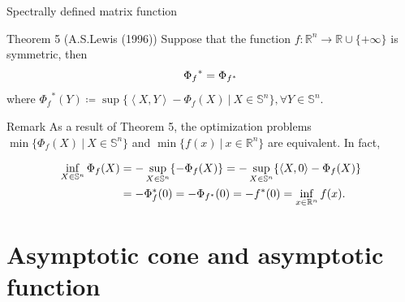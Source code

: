 \documentclass[aspectratio=169, dvipdfmx, 11pt]{beamer}
\newcommand{\RealNumberSet}{\mathbb{R}}
\newcommand{\NDemenstionalRealEuclideanSpace}{\mathbb{R}^n}
\newcommand{\NDemenstionalRealSymmetricMatrixSpace}{\mathbb{S}^n}
\newcommand{\InnerProduct}[2]{\left\langle {#1},{#2}\right\rangle} %
\newcommand{\ExtendedRealValuedFunction}[2]{{#1}: {#2} \to \RealNumberSet \cup \{+\infty\}}
\newcommand{\ConjugateFunction}[1]{{#1}^*}
\begin{document}
\begin{frame}{Spectrally defined matrix function}
  \begin{block}{Theorem 5 (A.S.Lewis (1996))}
    Suppose that the function $\ExtendedRealValuedFunction{f}{\NDemenstionalRealEuclideanSpace}$ is symmetric, then
    \begin{equation}
      {\Phi_{f}}^* = \Phi_{f^*} \notag
    \end{equation}
    where ${\Phi_{f}}^* (Y) \coloneqq \sup \{\InnerProduct{X}{Y} - \Phi_{f} (X) \:|\: X \in \NDemenstionalRealSymmetricMatrixSpace\}, \forall Y \in \NDemenstionalRealSymmetricMatrixSpace$.
  \end{block}

  \begin{alertblock}{Remark}
    As a result of Theorem 5, the optimization problems $\min \{\Phi_{f}(X) \:|\: X \in \NDemenstionalRealSymmetricMatrixSpace\}$ and $\min \{f(x) \:|\: x \in \NDemenstionalRealEuclideanSpace\}$ are equivalent. In fact,

    \begin{align}
      \inf_{X \in \NDemenstionalRealSymmetricMatrixSpace} \Phi_{f}(X) &= - \sup_{X \in \NDemenstionalRealSymmetricMatrixSpace} \{- \Phi_{f}(X)\} = - \sup_{X \in \NDemenstionalRealSymmetricMatrixSpace} \{\InnerProduct{X}{0} - \Phi_{f}(X)\} \notag \\
      &= - \Phi^*_{f}(0) = - \Phi_{\ConjugateFunction{f}}(0) = - \ConjugateFunction{f}(0) = \inf_{x \in \NDemenstionalRealEuclideanSpace} f(x). \notag
    \end{align}
  \end{alertblock}
\end{frame}

\section{Asymptotic cone and asymptotic function}
\end{document}
